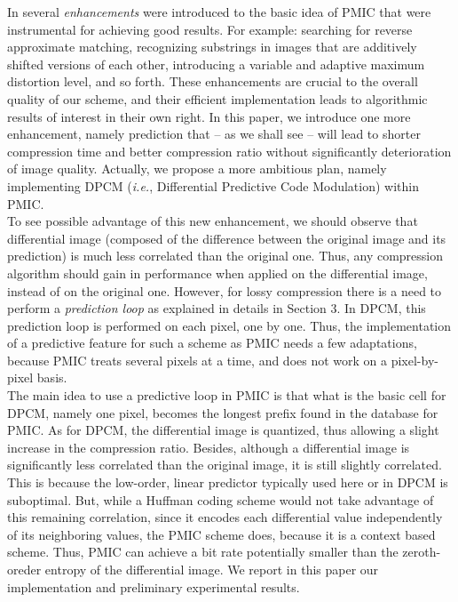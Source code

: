 \documentclass[11pt,a4paper]{article}
\newcommand{\ie}{{\em i.e.}}
\begin{document}
In \cite{ags} several {\it enhancements} were introduced to the basic idea
of PMIC that were instrumental for achieving good results. For example:
searching for reverse approximate matching, recognizing substrings in
images that are additively shifted versions of each other, introducing a
variable and adaptive maximum distortion level, and so forth.  These
enhancements are crucial to the overall quality of our scheme, and their
efficient implementation leads to algorithmic results of interest in their
own right. In this paper, we introduce one more enhancement, namely
prediction that -- as we shall see -- will lead to shorter compression time
and better compression ratio without significantly deterioration of image
quality. Actually, we propose a more ambitious plan, namely implementing
DPCM (\ie, Differential Predictive Code Modulation) within PMIC.\\

To see possible advantage of this new enhancement, we should observe that
differential image (composed of the difference between the original image
and its prediction) is much less correlated than the original one. Thus,
any compression algorithm should gain in performance when applied on the
differential image, instead of on the original one. However, for lossy
compression there is a need to perform a {\it prediction loop} as explained
in details in Section 3.  In DPCM, this prediction loop is performed on
each pixel, one by one. Thus, the implementation of a predictive feature
for such a scheme as PMIC needs a few adaptations, because PMIC treats
several pixels at a time, and does not work on a pixel-by-pixel basis.\\

The main idea to use a predictive loop in PMIC is that what is the basic
cell for DPCM, namely one pixel, becomes the longest prefix found in the
database for PMIC. As for DPCM, the differential image is quantized, thus
allowing a slight increase in the compression ratio. Besides, although a
differential image is significantly less correlated than the original
image, it is still slightly correlated. This is because the low-order,
linear predictor typically used here or in DPCM is suboptimal. But, while a
Huffman coding scheme would not take advantage of this remaining
correlation, since it encodes each differential value independently of its
neighboring values, the PMIC scheme does, because it is a context based
scheme. Thus, PMIC can achieve a bit rate potentially smaller than the
zeroth-oreder entropy of the differential image.  We report in this paper
our implementation and preliminary experimental results.
\end{document}
